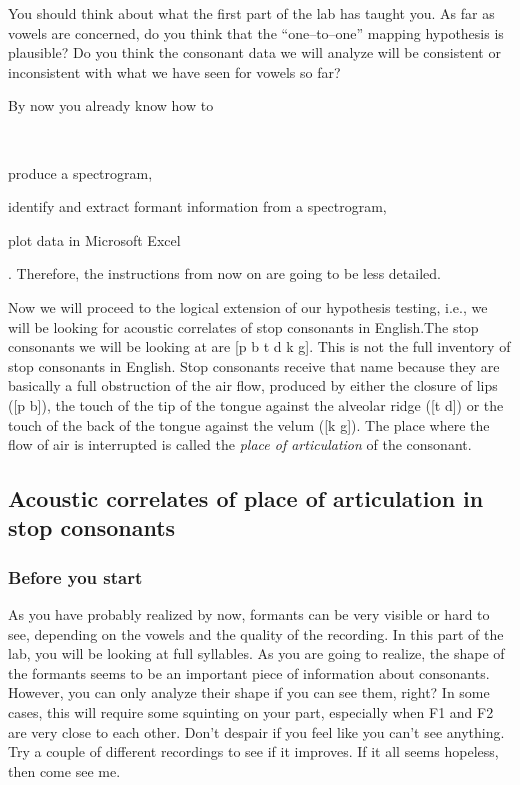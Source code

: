 \documentclass{article}
\newcommand{\soft}[1]{\textsf{#1}}
\newcommand{\MSExcel}{\soft{Microsoft\texttrademark{} Excel}}
\begin{document}
You should think about what the first part of the lab has taught you. As far as vowels are concerned, do you think  that the ``one--to--one'' mapping hypothesis is plausible? Do you think the consonant data we will analyze will be consistent or inconsistent with what we have seen for vowels so far?

By now you already know how to\begin{inparaenum}[(a)]~\item produce a spectrogram, \item identify and extract formant information from a spectrogram, \item plot data in \MSExcel{}\end{inparaenum}. Therefore, the instructions from now on are going to be less detailed.

Now we will proceed to the logical extension of our hypothesis testing, i.e., we will be looking for acoustic correlates of stop consonants in English.The stop consonants we will be looking at are [p b t d k g]. This is not the full inventory of stop consonants in English. Stop consonants receive that name because they are basically a full obstruction of the air flow, produced by either the closure of lips ([p b]), the touch of the tip of the tongue against the alveolar ridge ([t d]) or the touch of the back of the tongue against the velum ([k g]). The place where the flow of air is interrupted is called the \emph{place of articulation} of the consonant.

\subsection{Acoustic correlates of place of articulation in stop consonants}

\subsubsection{Before you start}

As you have probably realized by now, formants can be very visible or hard to see, depending on the vowels and the quality of the recording. In this part of the lab, you will be looking at full syllables. As you are going to realize, the shape of the formants seems to be an important piece of information about consonants. However, you can only analyze their shape if you can see them, right? In some cases, this will require some squinting on your part, especially when F1 and F2 are very close to each other. Don't despair if you feel like you can't see anything. Try a couple of different recordings to see if it improves. If it all seems hopeless, then come see me.
\end{document}
